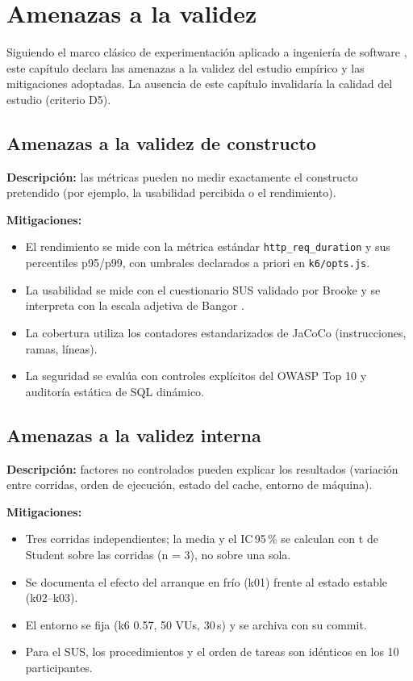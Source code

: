 \chapter{Amenazas a la validez}
\label{cap:amenazas}

Siguiendo el marco clásico de experimentación aplicado a ingeniería de software
\cite{wohlin2012}, este capítulo declara las amenazas a la validez del estudio
empírico y las mitigaciones adoptadas. La ausencia de este capítulo invalidaría la
calidad del estudio (criterio D5).

\section{Amenazas a la validez de constructo}

\textbf{Descripción:} las métricas pueden no medir exactamente el constructo
pretendido (por ejemplo, la usabilidad percibida o el rendimiento).

\textbf{Mitigaciones:}
\begin{itemize}
  \item El rendimiento se mide con la métrica estándar \texttt{http\_req\_duration}
        y sus percentiles p95/p99, con umbrales declarados a priori en
        \texttt{k6/opts.js}.
  \item La usabilidad se mide con el cuestionario SUS validado por Brooke
        \cite{brooke1996} y se interpreta con la escala adjetiva de Bangor
        \cite{bangor2009,bangor2008}.
  \item La cobertura utiliza los contadores estandarizados de JaCoCo (instrucciones,
        ramas, líneas).
  \item La seguridad se evalúa con controles explícitos del OWASP Top 10
        \cite{owasp2021} y auditoría estática de SQL dinámico.
\end{itemize}

\section{Amenazas a la validez interna}

\textbf{Descripción:} factores no controlados pueden explicar los resultados
(variación entre corridas, orden de ejecución, estado del cache, entorno de
máquina).

\textbf{Mitigaciones:}
\begin{itemize}
  \item Tres corridas independientes; la media y el IC\,95\,\% se calculan con
        t de Student sobre las corridas (n = 3), no sobre una sola.
  \item Se documenta el efecto del arranque en frío (k01) frente al estado
        estable (k02--k03).
  \item El entorno se fija (k6 0.57, 50 VUs, 30\,s) y se archiva con su commit.
  \item Para el SUS, los procedimientos y el orden de tareas son idénticos en los
        10 participantes.
\end{itemize}

